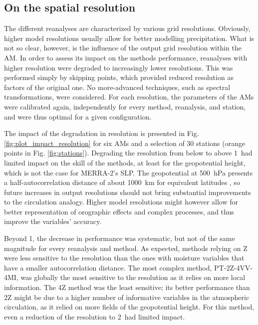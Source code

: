 \documentclass{ametsoc}
\begin{document}
	\subsection{On the spatial resolution}
	\label{sec:resolution}
	
	The different reanalyses are characterized by various grid resolutions. Obviously, higher model resolutions usually allow for better modelling precipitation. What is not so clear, however, is the influence of the output grid resolution within the AM. In order to assess its impact on the methods performance, reanalyses with higher resolution were degraded to increasingly lower resolutions. This was performed simply by skipping points, which provided reduced resolution as factors of the original one. No more-advanced techniques, such as spectral transformations, were considered. For each resolution, the parameters of the AMs were calibrated again, independently for every method, reanalysis, and station, and were thus optimal for a given configuration. 
	
	The impact of the degradation in resolution is presented in Fig. \ref{fig:plot_impact_resolution} for six AMs and a selection of 30 stations (orange points in Fig. \ref{fig:stations}). Degrading the resolution from below to above 1\degree\ had limited impact on the skill of the methods, at least for the geopotential height, which is not the case for MERRA-2's SLP. The geopotential at 500~hPa presents a half-autocorrelation distance of about 1000~km for equivalent latitudes \citep{Thiebaux1985}, so future increases in output resolutions should not bring substantial improvements to the circulation analogy. Higher model resolutions might however allow for better representation of orographic effects and complex processes, and thus improve the variables' accuracy. 
	
	Beyond 1\degree, the decrease in performance was systematic, but not of the same magnitude for every reanalysis and method. As expected, methods relying on Z were less sensitive to the resolution than the ones with moisture variables that have a smaller autocorrelation distance. The most complex method, PT-2Z-4VV-4MI, was globally the most sensitive to the resolution as it relies on more local information. The 4Z method was the least sensitive; its better performance than 2Z might be due to a higher number of informative variables in the atmospheric circulation, as it relied on more fields of the geopotential height. For this method, even a reduction of the resolution to 2\degree\ had limited impact.
	
\end{document}
